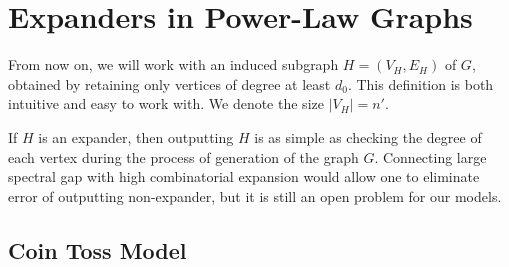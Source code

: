 \chapter{Expanders in Power-Law Graphs}
\label{ch:expanders}

From now on, we will work with an induced subgraph $H=(V_H,E_H)$ of $G$,
obtained by retaining only vertices of degree at least $d_0$.
This definition is both intuitive and easy to work with.
We denote the size $|V_H|=n'$.

If $H$ is an expander, then outputting $H$ is as simple as checking
the degree of each vertex during the process of generation of the graph $G$.
Connecting large spectral gap with high combinatorial expansion
would allow one to eliminate error of outputting non-expander,
but it is still an open problem for our models.

\section{Coin Toss Model}

